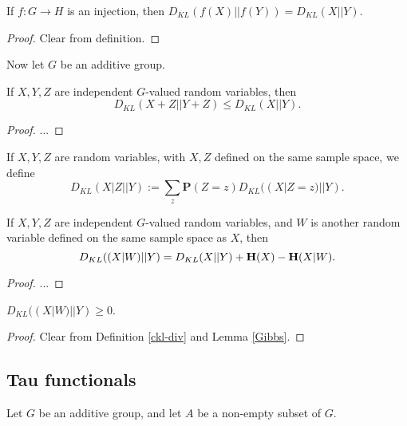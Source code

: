 \begin{lemma}\label{kl-div-inj}  If $f:G \to H$ is an injection, then $D_{KL}(f(X)||f(Y)) = D_{KL}(X||Y)$.
\end{lemma}

\begin{proof} Clear from definition.
\end{proof}

Now let $G$ be an additive group.

\begin{lemma}\label{kl-sums} If $X, Y, Z$ are independent $G$-valued random variables, then
  $$D_{KL}(X+Z||Y+Z) \leq D_{KL}(X||Y).$$
\end{lemma}

\begin{proof}
  ...
\end{proof}

\begin{definition}\label{ckl-div}  If $X,Y,Z$ are random variables, with $X,Z$ defined on the same sample space, we define
$$ D_{KL}(X|Z || Y) := \sum_z \mathbf{P}(Z=z) D_{KL}( (X|Z=z) || Y).$$
\end{definition}

\begin{lemma}\label{kl-cond} If $X, Y, Z$ are independent $G$-valued random variables, and $W$ is another random variable defined on the same sample space as $X$, then
  $$D_{KL}((X|W)||Y) = D_{KL}(X||Y) + {\bf H}(X) - {\bf H}(X|W).$$
\end{lemma}

\begin{proof} ...
\end{proof}

\begin{lemma}\label{Conditional-Gibbs}  $D_{KL}((X|W)||Y) \geq 0$.
\end{lemma}

\begin{proof}  Clear from Definition \ref{ckl-div} and Lemma \ref{Gibbs}.
\end{proof}

\subsection{Tau functionals}

Let $G$ be an additive group, and let $A$ be a non-empty subset of $G$.

